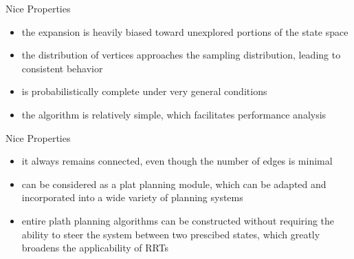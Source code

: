 \documentclass[%
  professionalfonts,%
  xcolor={%
    usenames,%
    dvipsnames,%
    svgnames,%
    table,%
    hyperref%
  }%
]{beamer}
\begin{document}
      \begin{frame}{Nice Properties}
        \begin{itemize}
          \item the expansion is heavily biased toward unexplored portions of the state space
          \item the distribution of vertices approaches the sampling distribution, leading to consistent behavior
          \item is probabilistically complete under very general conditions
          \item the algorithm is relatively simple, which facilitates performance analysis
        \end{itemize}
      \end{frame}
      
      \begin{frame}{Nice Properties}
        \begin{itemize}
          \item it always remains connected, even though the number of edges is minimal
          \item can be considered as a plat planning module, which can be adapted and incorporated into a wide variety of planning systems
          \item entire plath planning algorithms can be constructed without requiring the ability to steer the system between two prescibed states, which greatly broadens the applicability of RRTs
        \end{itemize}
      \end{frame}
      
\end{document}

